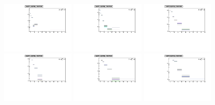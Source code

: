 \begin{figure}[bth]
\begin{center}
\includegraphics[width=0.32\textwidth]{pPbcuts_2sig/multi_trial/JetPtTrialsDPt0_log.pdf}
\includegraphics[width=0.32\textwidth]{pPbcuts_2sig/multi_trial/JetPtTrialsDPt1_log.pdf}
\includegraphics[width=0.32\textwidth]{pPbcuts_2sig/multi_trial/JetPtTrialsDPt2_log.pdf}
\includegraphics[width=0.32\textwidth]{pPbcuts_2sig/multi_trial/JetPtTrialsDPt3_log.pdf}
\includegraphics[width=0.32\textwidth]{pPbcuts_2sig/multi_trial/JetPtTrialsDPt4_log.pdf}
\includegraphics[width=0.32\textwidth]{pPbcuts_2sig/multi_trial/JetPtTrialsDPt5_log.pdf}

\end{center}
\end{figure}
